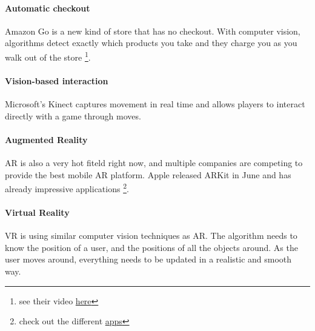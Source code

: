 \documentclass{article}
\begin{document}
\paragraph{Automatic checkout}
Amazon Go is a new kind of store that has no checkout. With computer vision, algorithms detect exactly which products you take and they charge you as you walk out of the store \footnote{see their video \href{https://www.amazon.com/b?node=16008589011}{here}}.

\paragraph{Vision-based interaction}
Microsoft's Kinect captures movement in real time and allows players to interact directly with a game through moves.

\paragraph{Augmented Reality}
AR is also a very hot fiteld right now, and multiple companies are competing to provide the best mobile AR platform. Apple released ARKit in June and has already impressive applications \footnote{check out the different \href{http://www.madewitharkit.com}{apps}}.

\paragraph{Virtual Reality}
VR is using similar computer vision techniques as AR. The algorithm needs to know the position of a user, and the positions of all the objects around. As the user moves around, everything needs to be updated in a realistic and smooth way.





\small


\end{document}
